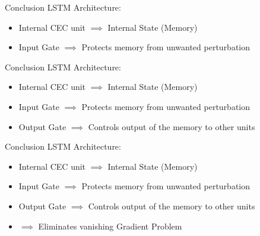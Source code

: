 \documentclass[10pt, aspectratio=169]{beamer}
\begin{document}
\begin{frame}[t]{Conclusion}
LSTM Architecture:
\begin{itemize}
    \item Internal CEC unit \begin{math}\implies \end{math} Internal State (Memory)
    \item Input Gate \begin{math}\implies\end{math} Protects memory from unwanted perturbation
\end{itemize}
\end{frame}

\begin{frame}[t]{Conclusion}
LSTM Architecture:
\begin{itemize}
    \item Internal CEC unit \begin{math}\implies \end{math} Internal State (Memory)
    \item Input Gate \begin{math}\implies\end{math} Protects memory from unwanted perturbation
    \item Output Gate \begin{math}\implies\end{math} Controls output of the memory to other units
\end{itemize}
\end{frame}

\begin{frame}[t]{Conclusion}
LSTM Architecture:
\begin{itemize}
    \item Internal CEC unit \begin{math}\implies \end{math} Internal State (Memory)
    \item Input Gate \begin{math}\implies\end{math} Protects memory from unwanted perturbation
    \item Output Gate \begin{math}\implies\end{math} Controls output of the memory to other units
    \item \begin{math}\implies\end{math} Eliminates vanishing Gradient Problem
\end{itemize}
\end{frame}
\end{document}
